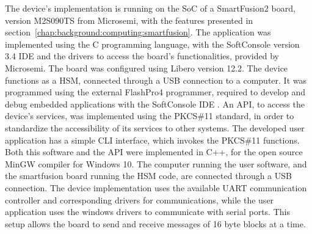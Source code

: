 The device's implementation is running on the SoC of a SmartFusion2 board, version M2S090TS from Microsemi, with the features presented in section~\ref{chap:background:computing:smartfusion}.
The application was implemented using the C programming language, with the SoftConsole version 3.4 IDE and the drivers to access the board's functionalities, provided by Microsemi. The board was configured using Libero version 12.2.
The device functions as a HSM, connected through a USB connection to a computer. It was programmed using the external FlashPro4 programmer, required to develop and debug embedded applications with the SoftConsole IDE \cite{smartfusionSecurityPractices}.
An API, to access the device's services, was implemented using the PKCS\#11 standard, in order to standardize the accessibility of its services to other systems. The developed user application has a simple \ac{CLI} interface, which invokes the PKCS\#11 functions. Both this software and the API were implemented in C++, for the open source MinGW compiler for Windows 10.
The computer running the user software, and the smartfusion board running the HSM code, are connected through a USB connection.
The device implementation uses the available \ac{UART} communication controller and corresponding drivers for communications, while the user application uses the windows drivers to communicate with serial ports.
This setup allows the board to send and receive messages of 16 byte blocks at a time.


